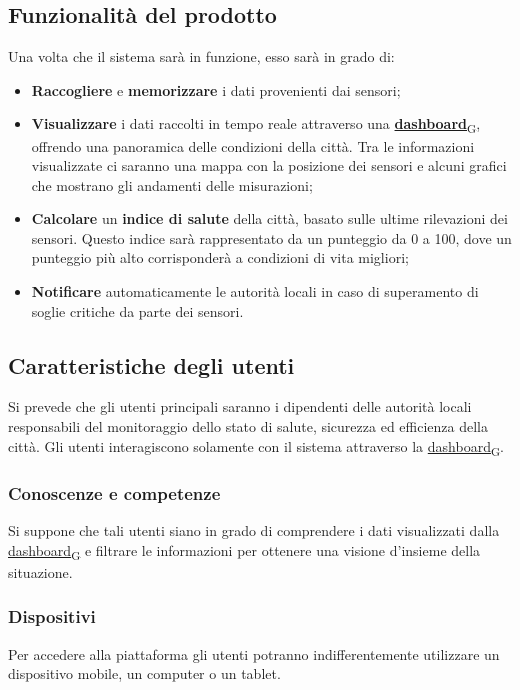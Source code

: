 
\subsection{Funzionalità del prodotto}
Una volta che il sistema sarà in funzione, esso sarà in grado di:
\begin{itemize}
	\item \textbf{Raccogliere} e \textbf{memorizzare} i dati provenienti dai sensori;
	\item \textbf{Visualizzare} i dati raccolti in tempo reale attraverso una \href{https://7last.github.io/docs/rtb/documentazione-interna/glossario\#dashboard}{\textbf{dashboard}\textsubscript{G}}, offrendo una panoramica delle condizioni della città.
	      Tra le informazioni visualizzate ci saranno una mappa con la posizione dei sensori e alcuni grafici che mostrano gli andamenti delle misurazioni;
	\item \textbf{Calcolare} un \textbf{indice di salute} della città, basato sulle ultime rilevazioni dei sensori. Questo indice sarà rappresentato da un punteggio da 0 a 100, dove un punteggio più alto corrisponderà a condizioni di vita migliori;
	\item \textbf{Notificare} automaticamente le autorità locali in caso di superamento di soglie critiche da parte dei sensori.
\end{itemize}

\subsection{Caratteristiche degli utenti}
Si prevede che gli utenti principali saranno i dipendenti delle autorità locali responsabili
del monitoraggio dello stato di salute, sicurezza ed efficienza della città.
Gli utenti interagiscono solamente con il sistema attraverso la \href{https://7last.github.io/docs/rtb/documentazione-interna/glossario\#dashboard}{dashboard\textsubscript{G}}.

\subsubsection{Conoscenze e competenze}
Si suppone che tali utenti siano in grado di comprendere i dati visualizzati dalla \href{https://7last.github.io/docs/rtb/documentazione-interna/glossario\#dashboard}{dashboard\textsubscript{G}} e filtrare le informazioni
per ottenere una visione d'insieme della situazione.

\subsubsection{Dispositivi}
Per accedere alla piattaforma gli utenti potranno indifferentemente utilizzare un dispositivo mobile, un computer o un tablet.






